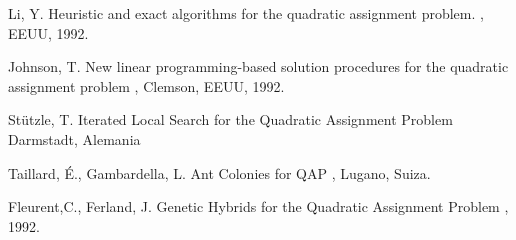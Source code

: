 \documentclass{ci5652}
\begin{document}
\begin{thebibliography}{99}
Li, Y.
\newblock Heuristic and exact algorithms for the quadratic assignment problem.
, EEUU, 1992.

Johnson, T.
\newblock New linear programming-based solution procedures for the quadratic assignment problem
, Clemson, EEUU, 1992.

Stützle, T.
\newblock Iterated Local Search for the Quadratic Assignment Problem
\newblock Darmstadt, Alemania

Taillard, É., Gambardella, L.
\newblock Ant Colonies for QAP
, Lugano, Suiza.

Fleurent,C., Ferland, J.
\newblock Genetic Hybrids for the Quadratic Assignment Problem
, 1992.

\end{thebibliography}
\end{document}

